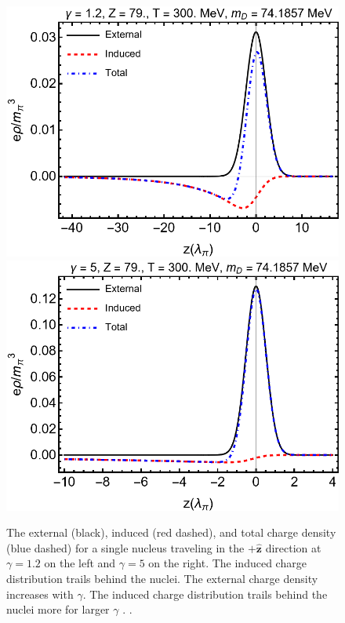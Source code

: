 \phantom{Phantom text}
\begin{figure}%
\centering
\includegraphics[width=0.75\linewidth]{plots/chap02QCD/indchg12.png}\\
\hspace{0.05\linewidth}
\includegraphics[width=0.75\linewidth]{plots/chap02QCD/indchg5.png}
\caption{The external (black), induced (red dashed), and total charge density (blue dashed) for a single nucleus traveling in the $+\boldsymbol{\hat{z}}$ direction at $\gamma = 1.2$ on the left and $\gamma = 5$ on the right. The induced charge distribution trails behind the nuclei. The external charge density increases with $\gamma$. The induced charge distribution trails behind the nuclei more for larger $\gamma$ \label{fig:potcomp}. .}
\end{figure}

